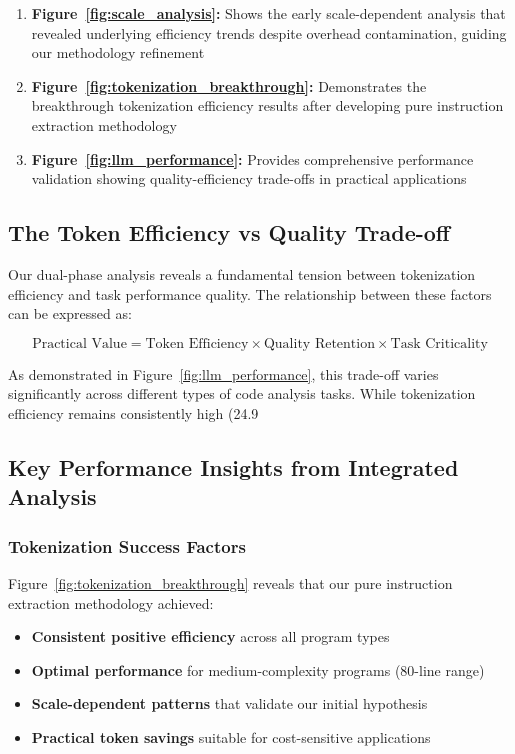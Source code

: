 \documentclass[11pt,a4paper]{article}
\begin{document}
\begin{enumerate}
    \item \textbf{Figure~\ref{fig:scale_analysis}:} Shows the early scale-dependent analysis that revealed underlying efficiency trends despite overhead contamination, guiding our methodology refinement
    \item \textbf{Figure~\ref{fig:tokenization_breakthrough}:} Demonstrates the breakthrough tokenization efficiency results after developing pure instruction extraction methodology
    \item \textbf{Figure~\ref{fig:llm_performance}:} Provides comprehensive performance validation showing quality-efficiency trade-offs in practical applications
\end{enumerate}

\subsection{The Token Efficiency vs Quality Trade-off}
Our dual-phase analysis reveals a fundamental tension between tokenization efficiency and task performance quality. The relationship between these factors can be expressed as:

\begin{equation}
\text{Practical Value} = \text{Token Efficiency} \times \text{Quality Retention} \times \text{Task Criticality}
\end{equation}

As demonstrated in Figure~\ref{fig:llm_performance}, this trade-off varies significantly across different types of code analysis tasks. While tokenization efficiency remains consistently high (24.9%

\subsection{Key Performance Insights from Integrated Analysis}

\subsubsection{Tokenization Success Factors}
Figure~\ref{fig:tokenization_breakthrough} reveals that our pure instruction extraction methodology achieved:
\begin{itemize}
    \item \textbf{Consistent positive efficiency} across all program types
    \item \textbf{Optimal performance} for medium-complexity programs (80-line range)
    \item \textbf{Scale-dependent patterns} that validate our initial hypothesis
    \item \textbf{Practical token savings} suitable for cost-sensitive applications
\end{itemize}
\end{document}
